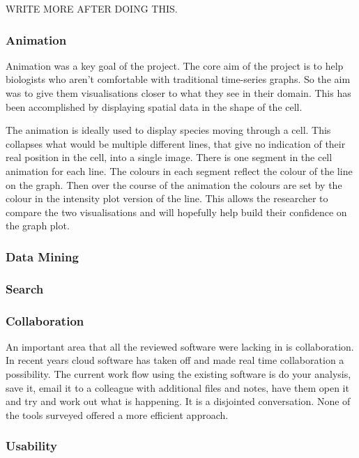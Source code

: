 WRITE MORE AFTER DOING THIS.

\subsubsection{Animation}

Animation was a key goal of the project.  The core aim of the project is to help biologists who aren't comfortable with traditional time-series graphs.  So the aim was to give them visualisations closer to what they see in their domain.  This has been accomplished by displaying spatial data in the shape of the cell.

The animation is ideally used to display species moving through a cell.  This collapses what would be multiple different lines, that give no indication of their real position in the cell, into a single image.  There is one segment in the cell animation for each line.  The colours in each segment reflect the colour of the line on the graph.  Then over the course of the animation the colours are set by the colour in the intensity plot version of the line.  This allows the researcher to compare the two visualisations and will hopefully help build their confidence on the graph plot.

\subsubsection{Data Mining}

\subsubsection{Search}

\subsubsection{Collaboration}

An important area that all the reviewed software were lacking in is collaboration.  In recent years cloud software has taken off and made real time collaboration a possibility.  The current work flow using the existing software is do your analysis, save it, email it to a colleague with additional files and notes, have them open it and try and work out what is happening.  It is a disjointed conversation.  None of the tools surveyed offered a more efficient approach.

\subsubsection{Usability}

